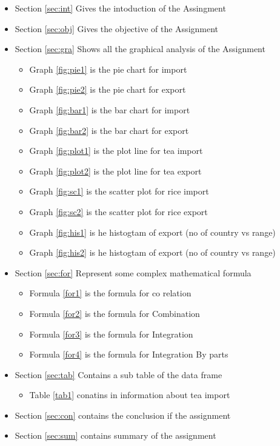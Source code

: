 \documentclass[a4paper,11pt]{article}
\begin{document}
{\fontsize{10}{20}\selectfont			%
\begin{itemize}
\item Section \ref{sec:int} Gives the intoduction of the Assingment
\item Section \ref{sec:obj} Gives the objective of the Assignment
\item Section \ref{sec:gra} Shows all the graphical analysis of the Assignment
	\begin{itemize}
	\item Graph \ref{fig:pie1}	is the pie chart for import
    \item Graph \ref{fig:pie2}	is the pie chart for export
    \item Graph \ref{fig:bar1}	is the bar chart for import
    \item Graph \ref{fig:bar2}	is the bar chart for export
    \item Graph \ref{fig:plot1} is the plot line for tea import
    \item Graph \ref{fig:plot2} is the plot line for tea export
    \item Graph \ref{fig:sc1}	is the scatter plot for rice import
    \item Graph \ref{fig:sc2}	is the scatter plot for rice export
    \item Graph \ref{fig:his1} 	is he histogtam of export (no of country vs range)
    \item Graph \ref{fig:his2} 	is he histogtam of export (no of country vs range)
	\end{itemize}
\item Section \ref{sec:for} Represent some complex mathematical formula
	\begin{itemize}
	\item Formula \ref{for1} is the formula  for co relation
    \item Formula \ref{for2} is the formula  for Combination
    \item Formula \ref{for3} is the formula for Integration
    \item Formula \ref{for4} is the formula for Integration By parts
	\end{itemize}
\item Section \ref{sec:tab} Contains a sub table of the data frame
	\begin{itemize}
	\item Table \ref{tab1} conatins in information about tea import
	\end{itemize}
\item Section \ref{sec:con} contains  the conclusion if the assignment
\item Section \ref{sec:sum} contains summary of the assignment
\end{itemize}

}
\end{document}
